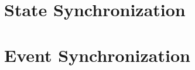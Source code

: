 


\section{State Synchronization}
\label{statesync}

\section{Event Synchronization}
\label{eventsync}
